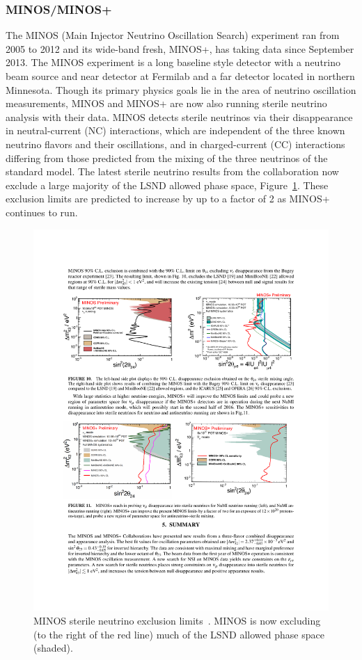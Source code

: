 \documentclass[aps,prd,twocolumn,nofootinbib]{revtex4-1}
\begin{document}
\subsubsection{MINOS/MINOS+}
The MINOS (Main Injector Neutrino Oscillation Search) experiment ran from 2005 to 2012 and its wide-band fresh, MINOS+, has taking data since September 2013. The MINOS experiment is a long baseline style detector with a neutrino beam source and near detector at Fermilab and a far detector located in northern Minnesota. Though its primary physics goals lie in the area of neutrino oscillation measurements, MINOS and MINOS+ are now also running sterile neutrino analysis with their data. MINOS detects sterile neutrinos via their disappearance in neutral-current (NC) interactions, which are independent of the three known neutrino flavors and their oscillations, and in charged-current (CC) interactions differing from those predicted from the mixing of the three neutrinos of the standard model. The latest sterile neutrino results from the collaboration \cite{MINOS} now exclude a large majority of the LSND allowed phase space, Figure~\ref{fig:MINOS}. These exclusion limits are predicted to increase by up to a factor of 2 as MINOS+ continues to run.

\begin{figure}[H]
 \centering
 \includegraphics[width=1\columnwidth]{../figures/minos2.pdf}
 \caption{MINOS sterile neutrino exclusion limits~\cite{MINOS}. MINOS is now excluding (to the right of the red line) much of the LSND allowed phase space (shaded).}
 \label{fig:MINOS}
\end{figure}
\end{document}
